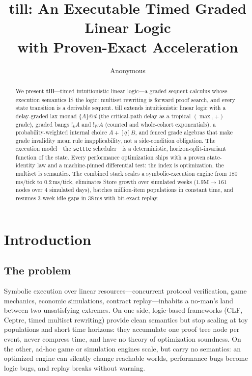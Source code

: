 \documentclass[11pt]{article}
\title{till: An Executable Timed Graded Linear Logic\\
       with Proven-Exact Acceleration}
\author{Anonymous}
\date{}
\makeatletter
\newcommand{\laxm}[2]{\{#1\}@{#2}}
\newcommand{\wop}[1]{+[{#1}]}
\theoremstyle{remark}
\makeatother
\begin{document}
\maketitle

\begin{abstract}
We present \textbf{till}---timed intuitionistic linear logic---a graded sequent
calculus whose execution semantics IS the logic: multiset rewriting is forward
proof search, and every state transition is a derivable sequent.  till extends
intuitionistic linear logic with a delay-graded lax monad $\laxm{A}{d}$ (the
critical-path delay as a tropical $(\max,{+})$ grade), graded bangs $!_k A$ and
$!_W A$ (counted and whole-cohort exponentials), a probability-weighted internal
choice $A \wop{q} B$, and fenced grade algebras that make grade invalidity mean
rule inapplicability, not a side-condition obligation.  The execution
model---the \texttt{settle} scheduler---is a deterministic, horizon-split-invariant
function of the state.  Every performance optimization ships with a proven
state-identity law and a machine-pinned differential test: the index is
optimization, the multiset is semantics.  The combined stack scales a
symbolic-execution engine from 180\,ms/tick to 0.2\,ms/tick, eliminates Store
growth over simulated weeks ($1.9\text{M} \to 161$ nodes over 4 simulated days),
batches million-item populations in constant time, and resumes 3-week idle gaps
in 38\,ms with bit-exact replay.
\end{abstract}

\section{Introduction}
\label{sec:intro}

\subsection{The problem}

Symbolic execution over linear resources---concurrent protocol verification, game
mechanics, economic simulations, contract replay---inhabits a no-man's land
between two unsatisfying extremes.  On one side, logic-based frameworks (CLF,
Ceptre, timed multiset rewriting) provide clean semantics but stop scaling at toy
populations and short time horizons: they accumulate one proof tree node per
event, never compress time, and have no theory of optimization soundness.  On the
other, ad-hoc game or simulation engines scale, but carry no semantics: an
optimized engine can silently change reachable worlds, performance bugs become
logic bugs, and replay breaks without warning.
\end{document}
